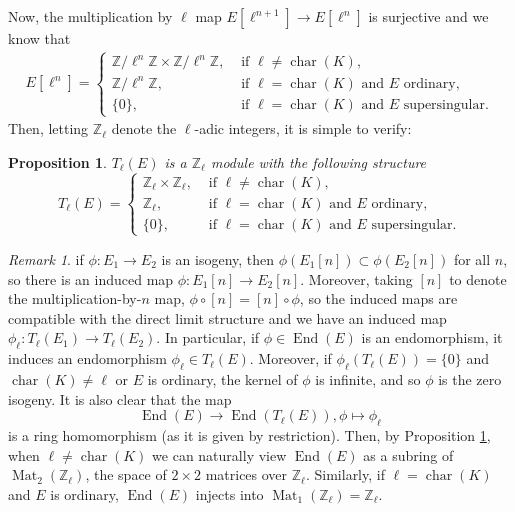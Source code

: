 \documentclass{amsart}
\newtheorem{prop}[thm]{Proposition}
\theoremstyle{definition}
\theoremstyle{remark}
\newtheorem{remark}[thm]{Remark}
\numberwithin{equation}{section}
\newcommand{\bbZ}{\mathbb Z}
\DeclareMathOperator{\Char}{char}
\DeclareMathOperator{\End}{End}
\DeclareMathOperator{\Mat}{Mat}
\begin{document}
 Now, the multiplication by $\ell$ map $E[\ell^{n+1}] \to E[\ell^{n}]$ is surjective and we know that 
 \begin{align} \label{eqn:SizeOfTorsionGroups}
 E[\ell^{n}] = 
 \begin{cases}
 \bbZ / \ell^n \bbZ \times \bbZ / \ell^n \bbZ , & \text{ if } \ell \neq \Char(K),\\
 \bbZ / \ell^n \bbZ , & \text{ if } \ell = \Char(K)\text{ and $E$ ordinary,}\\
 \{0\}, & \text{ if } \ell = \Char(K)\text{ and $E$ supersingular.}
 \end{cases}
 \end{align}
Then, letting $\bbZ_{\ell}$ denote the $\ell$-adic integers, it is simple to verify:
 \begin{prop} \label{prop:TateModuleStructure}
 $T_{\ell}(E)$ is a $\bbZ_{\ell}$ module with the following structure
 \[
 T_{\ell}(E) = 
 \begin{cases}
 \bbZ_{\ell} \times \bbZ_{\ell}, & \text{ if } \ell \neq \Char(K),\\
 \bbZ_{\ell}, & \text{ if } \ell = \Char(K)\text{ and $E$ ordinary,}\\
 \{0\}, & \text{ if } \ell = \Char(K)\text{ and $E$ supersingular.}
 \end{cases}
 \] 
 \end{prop}

\begin{remark} \label{rem:EndomorphimRingsInTateModules}
 if $\phi: E_{1} \to E_{2}$ is an isogeny, then $\phi(E_{1}[n]) \subset \phi(E_{2}[n])$ for all $n$, so there is an induced map $\phi: E_{1}[n] \to E_{2}[n]$. Moreover, taking $[n]$ to denote the multiplication-by-$n$ map, $\phi \circ [n] = [n] \circ \phi$, so the induced maps are compatible with the direct limit structure and we have an induced map $\phi_{\ell}: T_{\ell}(E_1) \to T_{\ell}(E_{2})$. In particular, if $\phi \in \End(E)$ is an endomorphism, it induces an endomorphism $\phi_{\ell} \in T_{\ell}(E)$. Moreover, if $\phi_{\ell}(T_{\ell}(E)) = \{0\}$ and $\Char(K) \neq \ell$ or $E$ is ordinary, the kernel of $\phi$ is infinite, and so $\phi$ is the zero isogeny. It is also clear that the map 
\[
 \End(E) \to \End(T_{\ell}(E)), \phi \mapsto \phi_{\ell}
\]
is a ring homomorphism (as it is given by restriction). Then, by Proposition \ref{prop:TateModuleStructure}, when $\ell \neq \Char(K)$ we can naturally view $\End(E)$ as a subring of $\Mat_{2}(\bbZ_{\ell})$, the space of $2\times 2$ matrices over $\bbZ_{\ell}$. Similarly, if $\ell = \Char(K)$ and $E$ is ordinary, $\End(E)$ injects into $\Mat_{1}(\bbZ_\ell) = \bbZ_{\ell}$.
\end{remark}
\end{document}
